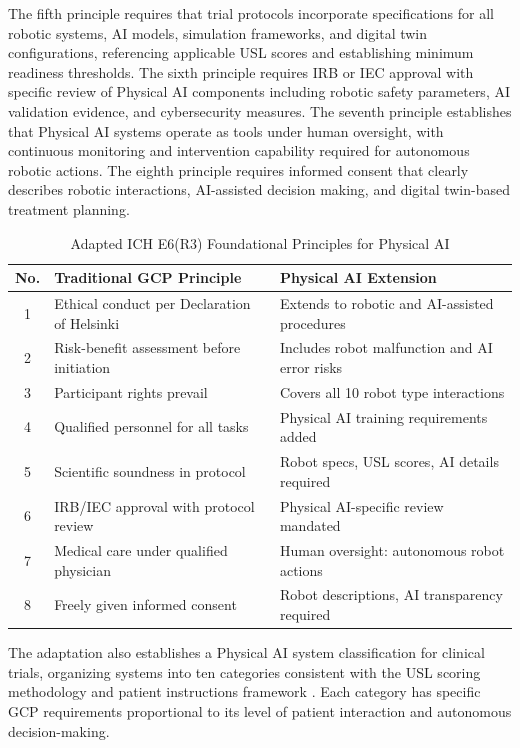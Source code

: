 The fifth principle requires that trial protocols incorporate specifications
for all robotic systems, AI models, simulation frameworks, and digital twin
configurations, referencing applicable USL scores \cite{usl-standard} and
establishing minimum readiness thresholds. The sixth principle requires IRB or
IEC approval with specific review of Physical AI components including robotic
safety parameters, AI validation evidence, and cybersecurity measures. The
seventh principle establishes that Physical AI systems operate as tools under
human oversight, with continuous monitoring and intervention capability
required for autonomous robotic actions. The eighth principle requires informed
consent that clearly describes robotic interactions, AI-assisted decision
making, and digital twin-based treatment planning.

\clearpage

\begin{table}[H]
\centering
\caption{Adapted ICH E6(R3) Foundational Principles for Physical AI}
\label{tab:ich-principles}
\small
\begin{tabularx}{\textwidth}{c X X}
\toprule
\textbf{No.} & \textbf{Traditional GCP Principle} & \textbf{Physical AI Extension} \\
\midrule
1 & Ethical conduct per Declaration of Helsinki & Extends to robotic and AI-assisted procedures \\
2 & Risk-benefit assessment before initiation & Includes robot malfunction and AI error risks \\
3 & Participant rights prevail & Covers all 10 robot type interactions \\
4 & Qualified personnel for all tasks & Physical AI training requirements added \\
5 & Scientific soundness in protocol & Robot specs, USL scores, AI details required \\
6 & IRB/IEC approval with protocol review & Physical AI-specific review mandated \\
7 & Medical care under qualified physician & Human oversight: autonomous robot actions \\
8 & Freely given informed consent & Robot descriptions, AI transparency required \\
\bottomrule
\end{tabularx}
\end{table}

The adaptation also establishes a Physical AI system classification for clinical
trials, organizing systems into ten categories consistent with the USL scoring
methodology \cite{usl-standard} and patient instructions framework
\cite{patient-instructions-paper}. Each category has specific GCP requirements
proportional to its level of patient interaction and autonomous decision-making.

